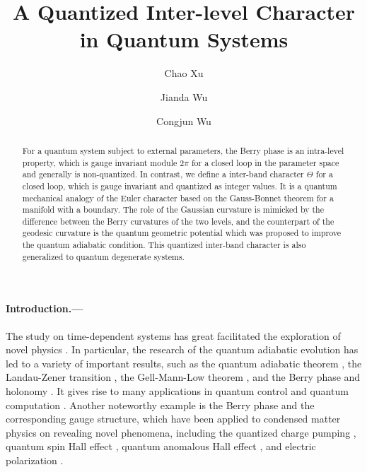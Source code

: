 \documentclass[aps,pra,twocolumn,groupedaddress,10pt]{revtex4}
\begin{document}
\title{A Quantized Inter-level Character in Quantum Systems}
\begin{abstract}
For a quantum system subject to external parameters, the Berry phase
is an intra-level property, which is gauge invariant module $2\pi$
for a closed loop in the parameter space and generally is non-quantized.
In contrast, we define a inter-band character $\Theta$ for a
closed loop, which is gauge invariant and quantized as integer
values.
It is a quantum mechanical analogy of the Euler character based
on the Gauss-Bonnet theorem for a manifold with a boundary.
The role of the Gaussian curvature is mimicked by
the difference between the Berry curvatures of the two levels, and
the counterpart of the geodesic curvature is the quantum geometric
potential which was proposed to improve the quantum adiabatic condition.
This quantized inter-band character is also generalized to
quantum degenerate systems.
\end{abstract}

\author{Chao Xu}
\author{Jianda Wu}
\author{Congjun Wu}
\maketitle


\paragraph*{Introduction.---}
The study on time-dependent systems has great facilitated the exploration
of novel physics \cite{farhi2001quantum,das2008colloquium,eckardt2017colloquium,
georgescu2014quantum,kral2007colloquium,xiao2010berry,zhou2016accelerated,
bason2012high,hollenberg2012quantum,barends2015digital,ashhab2006decoherence}.
In particular, the research of the quantum adiabatic evolution
has led to a variety of important results, such as the quantum
adiabatic theorem \cite{Born1928,Schwinger1937,Kato1950},
the Landau-Zener transition \cite{Landau1932,Zener1932},
the Gell-Mann-Low theorem \cite{Gellmann1951},
and the Berry phase and holonomy \cite{berry1984proc,simon1983holonomy}.
It gives rise to many applications in quantum control and quantum computation \cite{Oreg1984,Schiemann1993,Pillet1993,Jones2000,Childs2001,Zheng2005,Lidar2009,Lidar2016,Santos2017}.
Another noteworthy example is the Berry phase and the corresponding gauge structure, which have been applied to condensed matter physics on revealing
novel phenomena, including the quantized charge pumping \cite{niu1990towards,PhysRevB.27.6083},
quantum spin Hall effect \cite{murakami2003,murakami20042,guo2008intrinsic},
quantum anomalous Hall effect \cite{PhysRevLett.61.2015}, and
electric polarization \cite{king1993theory,RevModPhys.66.899}.
\end{document}
